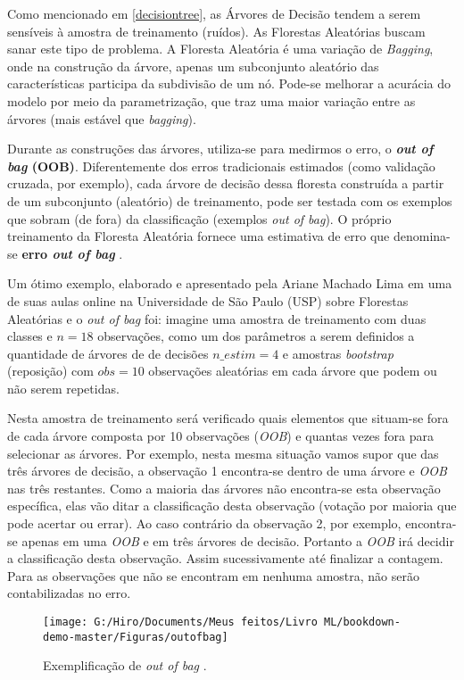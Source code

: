 \documentclass[
]{book}
\begin{document}
Como mencionado em \ref{decisiontree}, as Árvores de Decisão tendem a serem sensíveis à amostra de treinamento (ruídos). As Florestas Aleatórias buscam sanar este tipo de problema. A Floresta Aleatória é uma variação de \emph{Bagging}, onde na construção da árvore, apenas um subconjunto aleatório das características participa da subdivisão de um nó. Pode-se melhorar a acurácia do modelo por meio da parametrização, que traz uma maior variação entre as árvores (mais estável que \emph{bagging}).

Durante as construções das árvores, utiliza-se para medirmos o erro, o \textbf{\emph{out of bag} (OOB)}. Diferentemente dos erros tradicionais estimados (como validação cruzada, por exemplo), cada árvore de decisão dessa floresta construída a partir de um subconjunto (aleatório) de treinamento, pode ser testada com os exemplos que sobram (de fora) da classificação (exemplos \emph{out of bag}). O próprio treinamento da Floresta Aleatória fornece uma estimativa de erro que denomina-se \textbf{erro \emph{out of bag} }.

Um ótimo exemplo, elaborado e apresentado pela Ariane Machado Lima em uma de suas aulas online na Universidade de São Paulo (USP) sobre Florestas Aleatórias e o \emph{out of bag} foi: imagine uma amostra de treinamento com duas classes e \(n=18\) observações, como um dos parâmetros a serem definidos a quantidade de árvores de de decisões \(n\_estim=4\) e amostras \emph{bootstrap} (reposição) com \(obs=10\) observações aleatórias em cada árvore que podem ou não serem repetidas.

Nesta amostra de treinamento será verificado quais elementos que situam-se fora de cada árvore composta por 10 observações (\emph{OOB}) e quantas vezes fora para selecionar as árvores. Por exemplo, nesta mesma situação vamos supor que das três árvores de decisão, a observação 1 encontra-se dentro de uma árvore e \emph{OOB} nas três restantes. Como a maioria das árvores não encontra-se esta observação específica, elas vão ditar a classificação desta observação (votação por maioria que pode acertar ou errar). Ao caso contrário da observação 2, por exemplo, encontra-se apenas em uma \emph{OOB} e em três árvores de decisão. Portanto a \emph{OOB} irá decidir a classificação desta observação. Assim sucessivamente até finalizar a contagem. Para as observações que não se encontram em nenhuma amostra, não serão contabilizadas no erro.

\begin{figure}

{\centering \texttt{[image: G:/Hiro/Documents/Meus feitos/Livro ML/bookdown-demo-master/Figuras/outofbag]} 

}

\caption{Exemplificação de \emph{out of bag} \citep{machadousprf}.}\label{fig:outofbag}
\end{figure}
\end{document}
